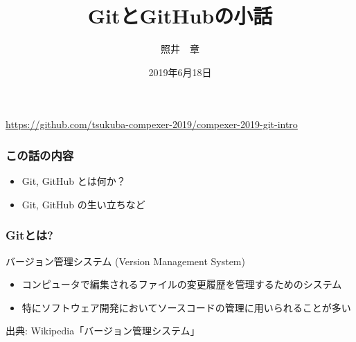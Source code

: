 \documentclass[dvipdfmx]{beamer}
\title{GitとGitHubの小話}
\author{照井　章}
\institute{筑波大学 数理物質系}
\date{2019年6月18日}
\begin{document}
    
\begin{frame}
    \frametitle{}
    \titlepage

    \begin{center}
        \url{https://github.com/tsukuba-compexer-2019/compexer-2019-git-intro}
    \end{center}
\end{frame}

\begin{frame}
    \frametitle{この話の内容}
    \large
    \begin{itemize}
        \item Git, GitHub とは何か？
        \item Git, GitHub の生い立ちなど
    \end{itemize}
\end{frame}

\begin{frame}
    \frametitle{Gitとは?}

    \begin{block}{バージョン管理システム (Version Management System)}
        \begin{itemize}
            \item コンピュータで編集されるファイルの変更履歴を管理するためのシステム
            \item 特にソフトウェア開発においてソースコードの管理に用いられることが多い
        \end{itemize}
    \end{block}

    \begin{flushright}
        出典: Wikipedia「バージョン管理システム」\cite{vcs}
    \end{flushright}
\end{frame}
\end{document}
